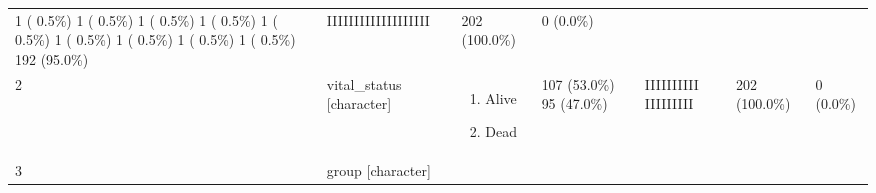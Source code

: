 \documentclass[
]{article}
\providecommand{\tightlist}{%
  \setlength{\itemsep}{0pt}\setlength{\parskip}{0pt}}
\begin{document}
\begin{longtable}[]{@{}lllllll@{}}
\begin{minipage}[t]{0.14\columnwidth}
1 ( 0.5\%)
1 ( 0.5\%)
1 ( 0.5\%)
1 ( 0.5\%)
1 ( 0.5\%)
1 ( 0.5\%)
1 ( 0.5\%)
1 ( 0.5\%)
1 ( 0.5\%)
192 (95.0\%)\strut
\end{minipage} & \begin{minipage}[t]{0.14\columnwidth}\raggedright
IIIIIIIIIIIIIIIIIII\strut
\end{minipage} & \begin{minipage}[t]{0.07\columnwidth}\raggedright
202
(100.0\%)\strut
\end{minipage} & \begin{minipage}[t]{0.07\columnwidth}\raggedright
0
(0.0\%)\strut
\end{minipage}\tabularnewline
\begin{minipage}[t]{0.03\columnwidth}\raggedright
2\strut
\end{minipage} & \begin{minipage}[t]{0.16\columnwidth}\raggedright
vital\_status
{[}character{]}\strut
\end{minipage} & \begin{minipage}[t]{0.20\columnwidth}\raggedright
\begin{enumerate}
\def\labelenumi{\arabic{enumi}.}
\tightlist
\item
  Alive
\item
  Dead
\end{enumerate}\strut
\end{minipage} & \begin{minipage}[t]{0.14\columnwidth}\raggedright
107 (53.0\%)
95 (47.0\%)\strut
\end{minipage} & \begin{minipage}[t]{0.14\columnwidth}\raggedright
IIIIIIIIII
IIIIIIIII\strut
\end{minipage} & \begin{minipage}[t]{0.07\columnwidth}\raggedright
202
(100.0\%)\strut
\end{minipage} & \begin{minipage}[t]{0.07\columnwidth}\raggedright
0
(0.0\%)\strut
\end{minipage}\tabularnewline
\begin{minipage}[t]{0.03\columnwidth}\raggedright
3\strut
\end{minipage} & \begin{minipage}[t]{0.16\columnwidth}\raggedright
group
{[}character{]}\strut
\end{minipage} & \begin{minipage}[t]{0.20\columnwidth}\raggedright
\begin{enumerate}

\end{enumerate}
\end{minipage}
\end{longtable}
\end{document}
